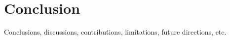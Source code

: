 \chapter{Conclusion}
\label{chapter:conclusion}

Conclusions, discussions, contributions, limitations, future directions, etc.
